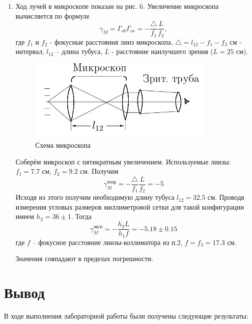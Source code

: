 \documentclass[a4paper,12pt]{article} %
\begin{document}
\begin{enumerate}
    \item Ход лучей в микроскопе показан на рис. 6. Увеличение микроскопа вычисляется по формуле
    \begin{equation}
        \gamma_M = \Gamma_{ob} \Gamma_{oc} = -\frac{\triangle}{f_1} \frac{L}{f_2},
    \end{equation}
    где $f_1$ и $f_2$ - фокусные расстояния линз микроскопа, $\triangle = l_{12}-f_1-f_2$ см - интервал, $ l_{12} $ -- длина тубуса, $L$ - расстояние наилучшего зрения ($L = 25$ см).
    
    \begin{figure}[h]
    \centering
    \includegraphics[width=9cm]{micro.jpg}
    \caption{Схема микроскопа}
    \label{fig:vac}
\end{figure}    
    
     Соберём микроскоп с пятикратным увеличением. Используемые линзы: $f_1 = 7.7 $ см, $ f_2 = 9.2 $ см. Получим
        \[ \gamma_M^\text{теор} = -\frac{\triangle}{f_1} \frac{L}{f_2} = -5 \]
    Исходя из этого получим необходимую длину тубуса $ l_{12} = 32.5 $ см.
    Проводя измерения угловых размеров миллиметровой сетки для такой конфигурации имеем $ h_2 = 36\pm1 $. Тогда
        \[ \boxed{\gamma_M^\text{эксп} = -\frac{h_2L}{h_1f} = -5.18 \pm 0.15} \]
        где $ f $ -- фокусное расстояние линзы-коллиматора из п.2, $ f = f_3 = 17.3 $ см.

Значения совпадают в пределах погрешности.
\end{enumerate}

\section*{Вывод}
В ходе выполнения лабораторной работы были получены следующие результаты:
\end{document}
